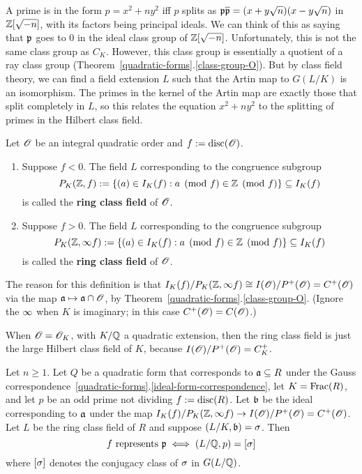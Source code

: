 A prime is in the form $p=x^2+ny^2$ iff $p$ splits as $\mathfrak{p}\overline{\mathfrak{p}}=(x+y\sqrt n)(x-y\sqrt n)$ in $\mathbb{Z}[\sqrt{-n}]$, with its factors being principal ideals. We can think of this as saying that $\mathfrak{p}$ goes to 0 in the ideal class group of $\mathbb{Z}[\sqrt{-n}]$. Unfortunately, this is not the same class group as $C_K$. However, this class group is %
essentially a quotient of a ray class group (Theorem~\ref{quadratic-forms}.\ref{class-group-O}).
But by class field theory, we can find a field extension $L$ such that the Artin map to $G(L/K)$ is an isomorphism. The primes in the kernel of the Artin map are exactly those that split completely in $L$, so this relates the equation $x^2+ny^2$ to the splitting of primes in the Hilbert class field.
\begin{df}
Let $\mathscr{O}$ be an integral quadratic order and $f:=\operatorname{disc}(\mathscr{O})$. 
\begin{enumerate}
\item Suppose $f<0$. 
The field $L$ corresponding to the congruence subgroup 
\[P_K(\mathbb{Z},f):=\left\{{(a)\in I_K(f)}:{a\pmod f\in \mathbb{Z}\pmod f}\right\}\subseteq I_K(f)\]
is called the \textbf{ring class field} of $\mathscr{O}$.
\item Suppose $f>0$. 
The field $L$ corresponding to the congruence subgroup 
\[P_K(\mathbb{Z},\infty f):=\left\{{(a)\in I_K(f)}:{a\pmod f\in \mathbb{Z}\pmod f}\right\}\subseteq I_K(f)\]
is called the \textbf{ring class field} of $\mathscr{O}$. 
\end{enumerate}
\end{df}
The reason for this definition is that $I_K(f)/P_K(\mathbb{Z},\infty f)\cong I(\mathscr{O})/P^+(\mathscr{O})=C^+(\mathscr{O})$ via the map $\mathfrak{a}\mapsto \mathfrak{a}\cap \mathscr{O}$, by Theorem~\ref{quadratic-forms}.\ref{class-group-O}. 
(Ignore the $\infty$ when $K$ is imaginary; in this case $C^+(\mathscr{O})=C(\mathscr{O})$.)
\begin{ex}
When $\mathscr{O}=\mathscr{O}_K$, with $K/\mathbb{Q}$ a quadratic extension, then the ring class field is just the large Hilbert class field of $K$, because $I(\mathscr{O})/P^+(\mathscr{O})=C_K^+$.
\end{ex}
\begin{thm}
Let $n\ge1$. Let $Q$ be a quadratic form that corresponds to $\mathfrak{a}\subseteq R$ under the Gauss correspondence~\ref{quadratic-forms}.\ref{ideal-form-correspondence}, let $K=\operatorname{Frac}(R)$, and let $p$ be an odd prime not dividing $f:=\operatorname{disc}(R)$. 
Let $\mathfrak{b}$ be the ideal corresponding to $\mathfrak{a}$ under the map $I_K(f)/P_K(\mathbb{Z},\infty f)\to I(\mathscr{O})/P^+(\mathscr{O})=C^+(\mathscr{O})$. Let $L$ be the ring class field of $R$ and suppose $(L/K,\mathfrak{b})=\sigma$. Then
\[
f\text{ represents }\mfp\iff %
(L/\Q,p)=[\si]
\]
where $[\sigma]$ denotes the conjugacy class of $\sigma$ in $G(L/\mathbb{Q})$.
\end{thm}
